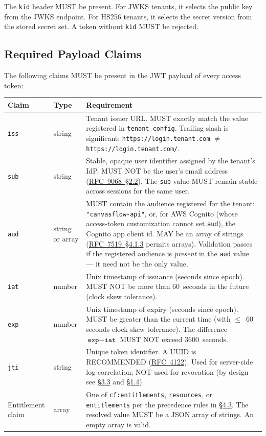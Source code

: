 The \texttt{kid} header MUST be present. For JWKS tenants, it selects the public key
from the JWKS endpoint. For HS256 tenants, it selects the secret version from the stored
secret set. A token without \texttt{kid} MUST be rejected.

\pagebreak

\subsection{Required Payload Claims}\label{sec:required-payload-claims}

The following claims MUST be present in the JWT payload of every access token:

\begin{longtable}{@{}lp{1.5cm}p{8cm}@{}}
\toprule
\textbf{Claim} & \textbf{Type} & \textbf{Requirement} \\
\midrule
\endhead
\texttt{iss} & string &
  Tenant issuer URL. MUST exactly match the value registered in \texttt{tenant\_config}.
  Trailing slash is significant: \texttt{https://login.tenant.com} $\neq$
  \texttt{https://login.tenant.com/}. \\[6pt]
\texttt{sub} & string &
  Stable, opaque user identifier assigned by the tenant's IdP. MUST NOT be the user's
  email address (\href{https://datatracker.ietf.org/doc/html/rfc9068\#section-2.2}{RFC~9068~\S2.2}). 
  The \texttt{sub} value MUST remain stable across
  sessions for the same user. \\[6pt]
\texttt{aud} & string or array &
  MUST contain the audience registered for the tenant: \texttt{"canvasflow-api"}, or,
  for AWS Cognito (whose access-token customization cannot set \texttt{aud}), the
  Cognito app client id. MAY be an array of strings
  (\href{https://datatracker.ietf.org/doc/html/rfc7519\#section-4.1.3}{RFC~7519~\S4.1.3}
  permits arrays). Validation passes if the registered audience is
  \emph{present} in the \texttt{aud} value --- it need not be the only value. \\[6pt]
\texttt{iat} & number &
  Unix timestamp of issuance (seconds since epoch). MUST NOT be more than 60~seconds in
  the future (clock skew tolerance). \\[6pt]
\texttt{exp} & number &
  Unix timestamp of expiry (seconds since epoch). MUST be greater than the current time
  (with $\leq$~60 seconds clock skew tolerance). The difference
  $\texttt{exp} - \texttt{iat}$ MUST NOT exceed 3600~seconds. \\[6pt]
\texttt{jti} & string &
  Unique token identifier. A UUID is RECOMMENDED (\href{https://datatracker.ietf.org/doc/html/rfc4122}{RFC~4122}). 
  Used for server-side log correlation; NOT used for revocation (by design --- 
  see \hyperref[sec:canvasflow-responsibilities]{\S3.3} and 
  \hyperref[sec:out-of-scope]{\S1.4}). \\[6pt]
Entitlement claim & array &
  One of \texttt{cf:entitlements}, \texttt{resources}, or \texttt{entitlements} per the
  precedence rules in \hyperref[sec:claim-name-hierarchy]{\S4.3}. The resolved value MUST
  be a JSON array of strings. An empty array is valid. \\
\bottomrule
\end{longtable}

